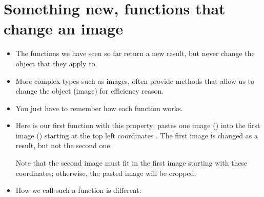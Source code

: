 \documentclass[letterpaper,10pt,english]{sphinxmanual}
\begin{document}
\section{Something new, functions that change an image}
\label{\detokenize{lecture_notes/lec07_modules_images:something-new-functions-that-change-an-image}}\begin{itemize}
\item {} 
The functions we have seen so far return a new result, but never
change the object that they apply to.

\item {} 
More complex types such as images, often provide methods that allow us to change the
object (image)
for efficiency reason.

\item {} 
You just have to remember how each function works.

\item {} 
Here is our first function with this property:  pastes one image () into the first image ()
starting at the top left coordinates . The first image is
changed as a result, but not the second one.

Note that the second image must fit in the first image starting
with these coordinates; otherwise, the pasted image will be cropped.

\item {} 
How we call such a function is different:

%
\begin{sphinxVerbatim}[commandchars=\\\{\}]
  
    
     
   
\end{sphinxVerbatim}


\end{itemize}
\end{document}
